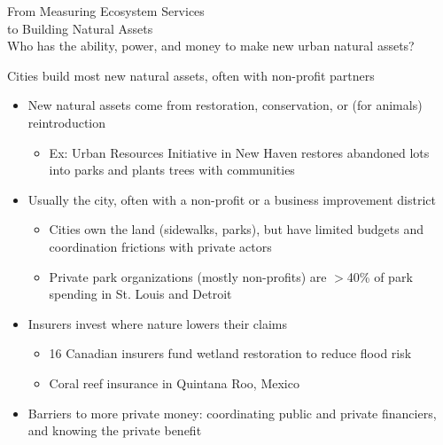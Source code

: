 \documentclass[aspectratio=169]{beamer}
\newcommand{\smallcite}[1]{\begingroup\scriptsize\citep{#1}\endgroup}
\begin{document}
\begin{frame}
    \begin{center}
        \Huge From Measuring Ecosystem Services\\to Building Natural Assets\\
        \vspace{.5cm}
        \Large Who has the ability, power, and money to make new urban natural assets?
    \end{center}
\end{frame}

\usebackgroundtemplate{}

\begin{frame}{Cities build most new natural assets, often with non-profit partners}
    \begin{itemize}
        \item New natural assets come from restoration, conservation, or (for animals) reintroduction
        \begin{itemize}
            \item Ex: Urban Resources Initiative in New Haven restores abandoned lots into parks and plants trees with communities \smallcite{chenMoreExtremelyHot2024}
        \end{itemize}
        \item Usually the city, often with a non-profit or a business improvement district
        \begin{itemize}
            \item Cities own the land (sidewalks, parks), but have limited budgets and coordination frictions with private actors \smallcite{toxopeusReviewingFinancingBarriers2021}
            \item Private park organizations (mostly non-profits) are $>$40\% of park spending in St. Louis and Detroit \smallcite{tplCityParkFacts2025}
        \end{itemize}
        \item Insurers invest where nature lowers their claims
        \begin{itemize}
            \item 16 Canadian insurers fund wetland restoration to reduce flood risk \smallcite{kouskyNatureInsuranceInsurance2025}
            \item Coral reef insurance in Quintana Roo, Mexico \smallcite{schelskeInsuringNaturalEcosystems2021}
        \end{itemize}
        \item Barriers to more private money: coordinating public and private financiers, and knowing the private benefit \smallcite{toxopeusReviewingFinancingBarriers2021}
    \end{itemize}
\end{frame}
\end{document}
